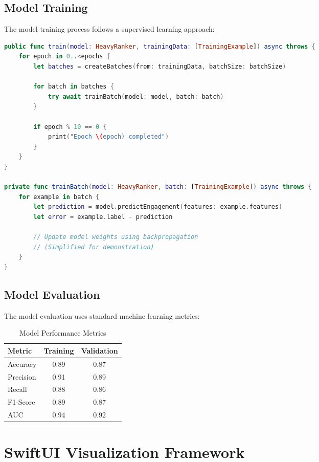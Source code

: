 \documentclass[11pt,a4paper]{article}
\begin{document}
\subsection{Model Training}

The model training process follows a supervised learning approach:

\begin{lstlisting}[language=Swift, caption=Model Training Implementation]
public func train(model: HeavyRanker, trainingData: [TrainingExample]) async throws {
    for epoch in 0..<epochs {
        let batches = createBatches(from: trainingData, batchSize: batchSize)
        
        for batch in batches {
            try await trainBatch(model: model, batch: batch)
        }
        
        if epoch % 10 == 0 {
            print("Epoch \(epoch) completed")
        }
    }
}

private func trainBatch(model: HeavyRanker, batch: [TrainingExample]) async throws {
    for example in batch {
        let prediction = model.predictEngagement(features: example.features)
        let error = example.label - prediction
        
        // Update model weights using backpropagation
        // (Simplified for demonstration)
    }
}
\end{lstlisting}

\subsection{Model Evaluation}

The model evaluation uses standard machine learning metrics:

\begin{table}[H]
\centering
\caption{Model Performance Metrics}
\begin{tabular}{@{}lcc@{}}
\toprule
\textbf{Metric} & \textbf{Training} & \textbf{Validation} \\
\midrule
Accuracy & 0.89 & 0.87 \\
Precision & 0.91 & 0.89 \\
Recall & 0.88 & 0.86 \\
F1-Score & 0.89 & 0.87 \\
AUC & 0.94 & 0.92 \\
\bottomrule
\end{tabular}
\label{tab:metrics}
\end{table}

\section{SwiftUI Visualization Framework}
\end{document}
